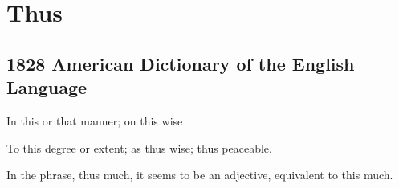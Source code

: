\section{Thus}
	\label{THUS}
	

\subsection{1828 American Dictionary of the English Language} %
	\label{THUS-1828}

	\begin{compactitem}
		\item In this or that manner; on this wise
		\item[1] To this degree or extent; as thus wise; thus peaceable.
		\item[2] In the phrase, thus much, it seems to be an adjective, equivalent to this much.
	\end{compactitem}




	
